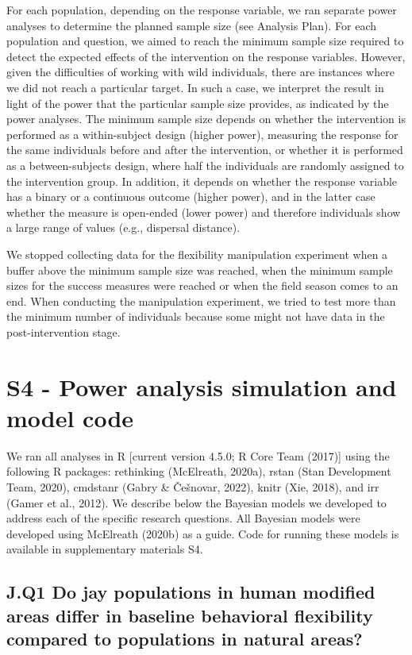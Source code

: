 \documentclass[
]{article}
\begin{document}
For each population, depending on the response variable, we ran separate
power analyses to determine the planned sample size (see Analysis Plan).
For each population and question, we aimed to reach the minimum sample
size required to detect the expected effects of the intervention on the
response variables. However, given the difficulties of working with wild
individuals, there are instances where we did not reach a particular
target. In such a case, we interpret the result in light of the power
that the particular sample size provides, as indicated by the power
analyses. The minimum sample size depends on whether the intervention is
performed as a within-subject design (higher power), measuring the
response for the same individuals before and after the intervention, or
whether it is performed as a between-subjects design, where half the
individuals are randomly assigned to the intervention group. In
addition, it depends on whether the response variable has a binary or a
continuous outcome (higher power), and in the latter case whether the
measure is open-ended (lower power) and therefore individuals show a
large range of values (e.g., dispersal distance).

We stopped collecting data for the flexibility manipulation experiment
when a buffer above the minimum sample size was reached, when the
minimum sample sizes for the success measures were reached or when the
field season comes to an end. When conducting the manipulation
experiment, we tried to test more than the minimum number of individuals
because some might not have data in the post-intervention stage.

\section{S4 - Power analysis simulation and model
code}\label{s4---power-analysis-simulation-and-model-code}

We ran all analyses in R {[}current version 4.5.0; R Core Team (2017){]}
using the following R packages: rethinking (McElreath, 2020a), rstan
(Stan Development Team, 2020), cmdstanr (Gabry \& Češnovar, 2022), knitr
(Xie, 2018), and irr (Gamer et al., 2012). We describe below the
Bayesian models we developed to address each of the specific research
questions. All Bayesian models were developed using McElreath (2020b) as
a guide. Code for running these models is available in supplementary
materials S4.

\subsection{J.Q1 Do jay populations in human modified areas differ in
baseline behavioral flexibility compared to populations in natural
areas?}\label{j.q1-do-jay-populations-in-human-modified-areas-differ-in-baseline-behavioral-flexibility-compared-to-populations-in-natural-areas}
\end{document}
